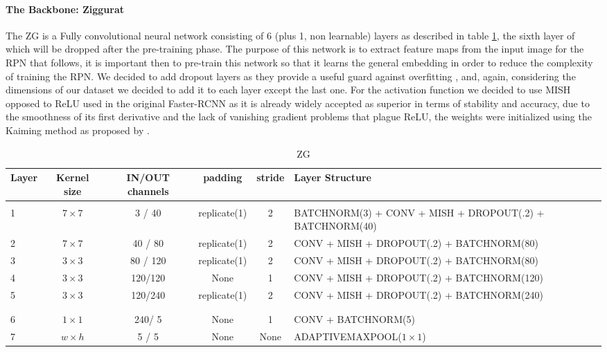 \documentclass[10pt,journal,cspaper,compsoc]{IEEEtran}
\begin{document}
    \paragraph*{The Backbone: Ziggurat}
    The ZG is a Fully convolutional neural network consisting of 6 (plus 1, non learnable) layers as described in table \ref{tab:Table 1}, the sixth layer of which will be dropped after the pre-training phase. 
    The purpose of this network is to extract feature maps from the input image for the RPN that follows,
    it is important then to pre-train this network so that it learns the general embedding in order 
    to reduce the complexity of training the RPN. 
    We decided to add dropout layers as they provide a useful guard against overfitting \cite{Srivastava:Dropout}, and, again, considering the dimensions of our dataset we decided to add it to each layer except the last one. For the activation function we decided to use MISH opposed to ReLU used in the original Faster-RCNN as it is already 
    widely accepted as superior in terms of stability and accuracy, due to the smoothness of its first derivative and the lack of vanishing gradient problems that plague ReLU, the weights were initialized using the Kaiming method as proposed by \cite{arxiv:Kaiming}.
    \begin{table}[htb]
        \centering
		\caption{ZG}
		\label{tab:Table 1}
		\begin{tabularx}{.9\paperwidth}{l | c | c | c | c |  l}  
			\textbf{Layer} & \textbf{Kernel size} & \textbf{IN/OUT channels} & \textbf{padding} & \textbf{stride} & \textbf{Layer Structure}\\
			\hline 
			& & & & & \\
			1 & $7\times 7$ & 3 / 40 & replicate(1) & 2 & BATCHNORM(3) + CONV + MISH + DROPOUT(.2) + BATCHNORM(40) \\
			2 & $7\times 7$ & 40 / 80 & replicate(1) & 2 & CONV + MISH + DROPOUT(.2) + BATCHNORM(80) \\
			3 & $3\times 3$ & 80 / 120 & replicate(1) & 2 & CONV + MISH + DROPOUT(.2) + BATCHNORM(80) \\ 
			4 & $3\times 3$ & 120/120 & None & 1 & CONV + MISH + DROPOUT(.2) + BATCHNORM(120)  \\
			5 & $3\times 3$ & 120/240 & replicate(1) & 2 & CONV + MISH + DROPOUT(.2) + BATCHNORM(240) \\
			& & & & & \\
			\hline
			& & & & & \\
			6 & $1\times 1$ & 240/ 5 & None & 1 & CONV + BATCHNORM(5)\\
            7 & $w\times h$ & 5 / 5 & None & None & ADAPTIVEMAXPOOL($1 \times 1$)
		\end{tabularx}
    \end{table}
    
\end{document}
